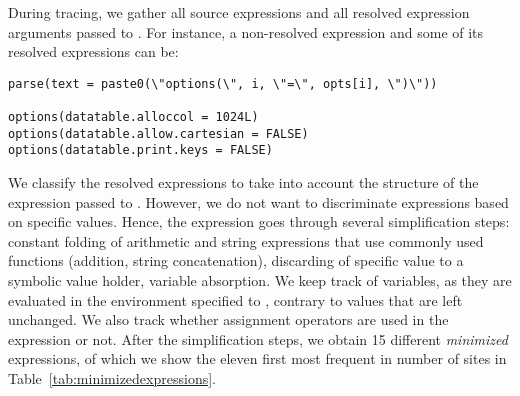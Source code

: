 \documentclass[screen,acmsmall]{acmart}
\begin{document}
During tracing, we gather all source expressions and all resolved expression arguments passed to \eval. For instance, a non-resolved expression and some of its resolved expressions can be:

\begin{lstlisting}
parse(text = paste0(\"options(\", i, \"=\", opts[i], \")\"))

options(datatable.alloccol = 1024L)
options(datatable.allow.cartesian = FALSE)
options(datatable.print.keys = FALSE)
\end{lstlisting}

We classify the resolved expressions to take into account the structure of the expression passed to \eval.
However, we do not want to discriminate expressions based on specific values. Hence, the expression goes through several simplification steps: constant folding of arithmetic and string expressions that use commonly used functions (addition, string concatenation), discarding of specific value to a symbolic value holder, variable absorption. We keep track of variables, as they are evaluated in the environment specified to \eval, contrary to values that are left unchanged. We also track whether assignment operators are used in the expression or not. After the simplification steps, we obtain 15 different \emph{minimized} expressions, of which we show the eleven first most frequent in number of sites in Table~\ref{tab:minimizedexpressions}.
\end{document}
